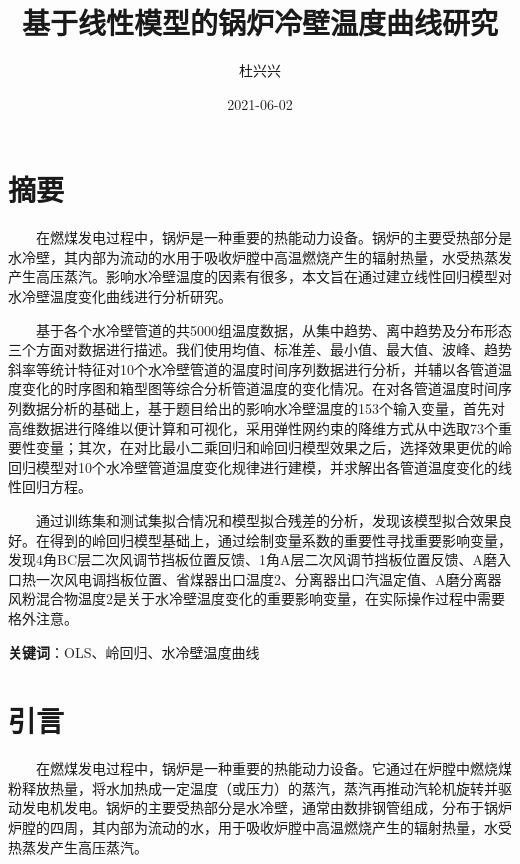 \documentclass[
]{article}
\title{基于线性模型的锅炉冷壁温度曲线研究}
\author{杜兴兴}
\date{2021-06-02}
\begin{document}
\maketitle

{
\setcounter{tocdepth}{2}
\tableofcontents
}

\hypertarget{ux6458ux8981}{%
\section{摘要}\label{ux6458ux8981}}

  在燃煤发电过程中，锅炉是一种重要的热能动力设备。锅炉的主要受热部分是水冷壁，其内部为流动的水用于吸收炉膛中高温燃烧产生的辐射热量，水受热蒸发产生高压蒸汽。影响水冷壁温度的因素有很多，本文旨在通过建立线性回归模型对水冷壁温度变化曲线进行分析研究。

  基于各个水冷壁管道的共5000组温度数据，从集中趋势、离中趋势及分布形态三个方面对数据进行描述。我们使用均值、标准差、最小值、最大值、波峰、趋势斜率等统计特征对10个水冷壁管道的温度时间序列数据进行分析，并辅以各管道温度变化的时序图和箱型图等综合分析管道温度的变化情况。在对各管道温度时间序列数据分析的基础上，基于题目给出的影响水冷壁温度的153个输入变量，首先对高维数据进行降维以便计算和可视化，采用弹性网约束的降维方式从中选取73个重要性变量；其次，在对比最小二乘回归和岭回归模型效果之后，选择效果更优的岭回归模型对10个水冷壁管道温度变化规律进行建模，并求解出各管道温度变化的线性回归方程。

  通过训练集和测试集拟合情况和模型拟合残差的分析，发现该模型拟合效果良好。在得到的岭回归模型基础上，通过绘制变量系数的重要性寻找重要影响变量，发现4角BC层二次风调节挡板位置反馈、1角A层二次风调节挡板位置反馈、A磨入口热一次风电调挡板位置、省煤器出口温度2、分离器出口汽温定值、A磨分离器风粉混合物温度2是关于水冷壁温度变化的重要影响变量，在实际操作过程中需要格外注意。

\textbf{关键词}：OLS、岭回归、水冷壁温度曲线

\newpage

\hypertarget{ux5f15ux8a00}{%
\section{引言}\label{ux5f15ux8a00}}

  在燃煤发电过程中，锅炉是一种重要的热能动力设备。它通过在炉膛中燃烧煤粉释放热量，将水加热成一定温度（或压力）的蒸汽，蒸汽再推动汽轮机旋转并驱动发电机发电。锅炉的主要受热部分是水冷壁，通常由数排钢管组成，分布于锅炉炉膛的四周，其内部为流动的水，用于吸收炉膛中高温燃烧产生的辐射热量，水受热蒸发产生高压蒸汽。
\end{document}
